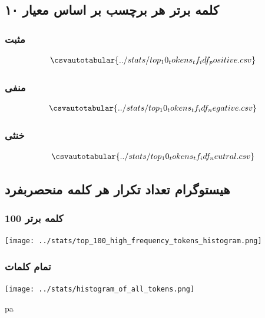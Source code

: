 {		 \subsection{۱۰ کلمه برتر هر برچسب بر اساس معیار }
		{
			\subsubsection{\Large مثبت}
			{ \selectfont \setLR
				\begin{align*}
					\csvautotabular{../stats/top_10_tokens_tf_idf_positive.csv}  
				\end{align*}
			}
			\newpage
			\subsubsection{\Large منفی}
			{ \selectfont \setLR
				\begin{align*}
					\csvautotabular{../stats/top_10_tokens_tf_idf_negative.csv}  
				\end{align*}
			}
			\newpage
			\subsubsection{\Large خنثی}
			{ \selectfont \setLR
				\begin{align*}
					\csvautotabular{../stats/top_10_tokens_tf_idf_neutral.csv}  
				\end{align*}
			}
		}
		\newpage
		\subsection{هیستوگرام تعداد تکرار هر کلمه منحصربفرد}
		{
			\subsubsection{100 کلمه برتر}
			{
				\begin{center}
					\texttt{[image: ../stats/top\_100\_high\_frequency\_tokens\_histogram.png]}
				\end{center}
			}
			\subsubsection{تمام کلمات}
			{
				\begin{center}
					\texttt{[image: ../stats/histogram\_of\_all\_tokens.png]}
				\end{center}
			}
pa		}
	}